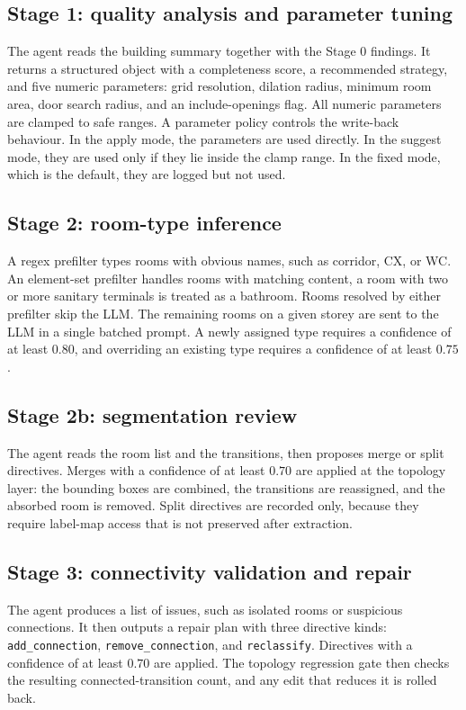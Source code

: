 \documentclass[a4paper, 10pt, conference]{ieeeconf}
\begin{document}
\subsection{Stage 1: quality analysis and parameter tuning}
The agent reads the building summary together with the Stage 0 findings. It returns a structured object with a completeness score, a recommended strategy, and five numeric parameters: grid resolution, dilation radius, minimum room area, door search radius, and an include-openings flag. All numeric parameters are clamped to safe ranges. A parameter policy controls the write-back behaviour. In the apply mode, the parameters are used directly. In the suggest mode, they are used only if they lie inside the clamp range. In the fixed mode, which is the default, they are logged but not used.

\subsection{Stage 2: room-type inference}
A regex prefilter types rooms with obvious names, such as corridor, CX, or WC. An element-set prefilter handles rooms with matching content, a room with two or more sanitary terminals is treated as a bathroom. Rooms resolved by either prefilter skip the LLM. The remaining rooms on a given storey are sent to the LLM in a single batched prompt. A newly assigned type requires a confidence of at least $0.80$, and overriding an existing type requires a confidence of at least $0.75$.

\subsection{Stage 2b: segmentation review}
The agent reads the room list and the transitions, then proposes merge or split directives. Merges with a confidence of at least $0.70$ are applied at the topology layer: the bounding boxes are combined, the transitions are reassigned, and the absorbed room is removed. Split directives are recorded only, because they require label-map access that is not preserved after extraction.

\subsection{Stage 3: connectivity validation and repair}
The agent produces a list of issues, such as isolated rooms or suspicious connections. It then outputs a repair plan with three directive kinds: \texttt{add\_connection}, \texttt{remove\_connection}, and \texttt{reclassify}. Directives with a confidence of at least $0.70$ are applied. The topology regression gate then checks the resulting connected-transition count, and any edit that reduces it is rolled back.
\end{document}
